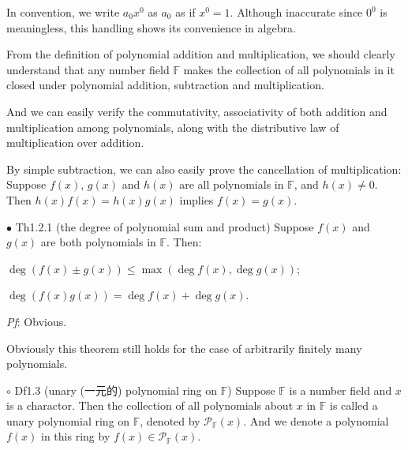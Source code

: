 \documentclass{article}
\begin{document}
\begin{Rmk}{}
\begin{compactenum}
        \item \textcolor{Df}{In convention, we write $a_0x^0$ as $a_0$ as if $x^0 = 1$. Although inaccurate since $0^0$ is meaningless, this handling shows its convenience in algebra.}
        \item From the definition of polynomial addition and multiplication, we should clearly understand that \textcolor{Th}{any number field $\mathbb{F}$ makes the collection of all polynomials in it closed under polynomial addition, subtraction and multiplication.}
        \item And we can easily verify \textcolor{Th}{the commutativity, associativity of both addition and multiplication among polynomials, along with the distributive law of multiplication over addition.}
        \item By simple subtraction, we can also easily prove the cancellation of multiplication:\\
        \textcolor{Th}{Suppose $f(x)$, $g(x)$ and $h(x)$ are all polynomials in $\mathbb{F}$, and $h(x)\neq 0$. Then $h(x)f(x) = h(x)g(x)$ implies $f(x) = g(x)$.}
    \end{compactenum}
\end{Rmk}

\begin{Th}{$\bullet$ Th1.2.1 (the degree of polynomial sum and product)}
    Suppose $f(x)$ and $g(x)$ are both polynomials in $\mathbb{F}$. Then:
    \begin{compactenum}
        \item $\deg(f(x)\pm g(x))\leq \max(\deg f(x), \deg g(x))$;
        \item $\deg(f(x)g(x)) = \deg f(x)+\deg g(x)$.
    \end{compactenum}
    \tcblower
    \textit{Pf}: Obvious.
\end{Th}

\begin{Rmk}{}
    Obviously this theorem still holds for the case of arbitrarily finitely many polynomials.
\end{Rmk}

\begin{Df}{$\circ$ Df1.3 (unary (一元的) polynomial ring on $\mathbb{F}$)}
    Suppose $\mathbb{F}$ is a number field and $x$ is a charactor. Then the collection of all polynomials about $x$ in $\mathbb{F}$ is called a unary polynomial ring on $\mathbb{F}$, denoted by $\mathcal{P}_\mathbb{F}(x)$. And we denote a polynomial $f(x)$ in this ring by $f(x)\in \mathcal{P}_\mathbb{F}(x)$.
\end{Df}
\end{document}

